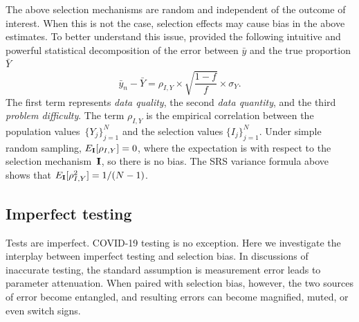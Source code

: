 \documentclass[12pt]{amsart}
\numberwithin{equation}{section}
\theoremstyle{plain}
\def\I{\bf I}
\begin{document}
The above selection mechanisms are random and independent of the outcome of interest. When this is not the case, selection effects may cause bias in the above estimates. To better understand this issue, \cite{Meng2018} provided the following intuitive and powerful statistical decomposition of the error between $\bar y$ and the true proportion $\bar Y$
$$
\bar y_n - \bar Y =  \rho_{I, Y} \times \sqrt{\frac{1-f}{f}} \times \sigma_Y.
$$
The first term represents \emph{data quality}, the second \emph{data quantity}, and the third \emph{problem difficulty}. The term $\rho_{I,Y}$ is the empirical correlation between the population values~$\{ Y_j \}_{j=1}^N$ and the selection values $\{ I_j \}_{j=1}^N$.  Under simple random sampling, $E_{\I} [ \rho_{I,Y} ] = 0$, where the expectation is with respect to the selection mechanism~$\I$, so there is no bias.  The SRS variance formula above shows that $E_{\I} [ \rho_{I,Y}^2 ]  = 1/(N-1)$.


\subsection{Imperfect testing}
\label{section:imperfecttesting}

Tests are imperfect.  COVID-19 testing is no exception. Here we investigate the interplay between imperfect testing and selection bias.  In discussions of inaccurate testing, the standard assumption is measurement error leads to parameter attenuation.  When paired with selection bias, however, the two sources of error become entangled, and resulting errors can become magnified, muted, or even switch signs.
\end{document}
